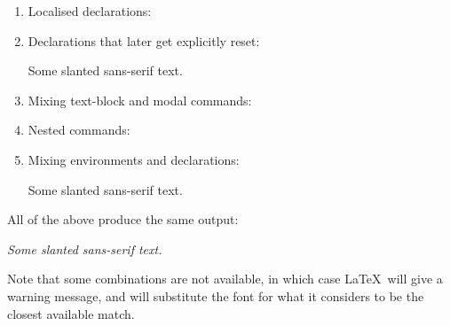 \begin{enumerate}
\item Localised declarations:

\begin{codeS}
\end{codeS}

\item Declarations that later get explicitly reset:

\begin{codeS}
 Some slanted sans-serif
text.
\end{codeS}

\bookpagebreak
\item Mixing text-block and modal commands:

\begin{codeS}
\end{codeS}

\item Nested commands:

\begin{codeS}
\end{codeS}

\item Mixing environments and declarations:

\begin{code}
 Some slanted sans-serif 
text.
\end{code}
\end{enumerate}

All of the above produce the same output:
\begin{resultS}
\textsf{\slshape Some slanted sans-serif text.}
\end{resultS}

Note that some combinations are not
available, in which case \LaTeX\ will give a warning message, and
will substitute the font for what it considers to be the closest
available match.


